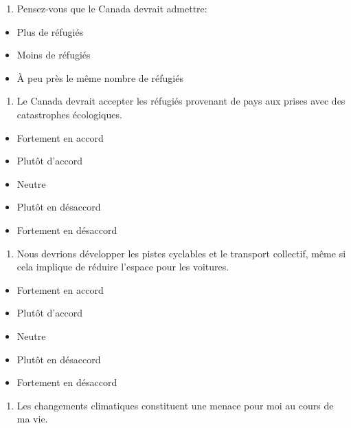 \documentclass[
  letterpaper,
  DIV=11,
  numbers=noendperiod]{scrreprt}
\providecommand{\tightlist}{%
  \setlength{\itemsep}{0pt}\setlength{\parskip}{0pt}}\usepackage{longtable,booktabs,array}
\begin{document}
\begin{enumerate}
\def\labelenumi{\arabic{enumi}.}
\setcounter{enumi}{34}
\tightlist
\item
  Pensez-vous que le Canada devrait admettre:
\end{enumerate}

\begin{itemize}
\tightlist
\item
  Plus de réfugiés
\item
  Moins de réfugiés
\item
  À peu près le même nombre de réfugiés
\end{itemize}

\begin{enumerate}
\def\labelenumi{\arabic{enumi}.}
\setcounter{enumi}{35}
\tightlist
\item
  Le Canada devrait accepter les réfugiés provenant de pays aux prises
  avec des catastrophes écologiques.
\end{enumerate}

\begin{itemize}
\tightlist
\item
  Fortement en accord
\item
  Plutôt d'accord
\item
  Neutre
\item
  Plutôt en désaccord
\item
  Fortement en désaccord
\end{itemize}

\begin{enumerate}
\def\labelenumi{\arabic{enumi}.}
\setcounter{enumi}{36}
\tightlist
\item
  Nous devrions développer les pistes cyclables et le transport
  collectif, même si cela implique de réduire l'espace pour les
  voitures.
\end{enumerate}

\begin{itemize}
\tightlist
\item
  Fortement en accord
\item
  Plutôt d'accord
\item
  Neutre
\item
  Plutôt en désaccord
\item
  Fortement en désaccord
\end{itemize}

\begin{enumerate}
\def\labelenumi{\arabic{enumi}.}
\setcounter{enumi}{37}
\tightlist
\item
  Les changements climatiques constituent une menace pour moi au cours
  de ma vie.
\end{enumerate}
\end{document}
